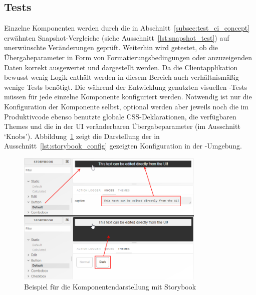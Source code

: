 \subsection{Tests}
Einzelne Komponenten werden durch die in Abschnitt~\ref{subsec:test_ci_concept} erwähnten Snapshot-Vergleiche (siehe Ausschnitt~\ref{lst:snapshot_test}) auf unerwünschte Veränderungen geprüft. Weiterhin wird getestet, ob die Übergabeparameter in Form von Formatierungsbedingungen oder anzuzeigenden Daten korrekt ausgewertet und dargestellt werden. Da die Clientapplikation bewusst wenig Logik enthält werden in diesem Bereich auch verhältnismäßig wenige Tests benötigt.
Die während der Entwicklung genutzten visuellen -Tests müssen für jede einzelne Komponente konfiguriert werden. Notwendig ist nur die Konfiguration der Komponente selbst, optional werden aber jeweils noch die im Produktivcode ebenso benutzte globale CSS-Deklarationen, die verfügbaren Themes und die in der UI veränderbaren Übergabeparameter (im Ausschnitt `Knobs'). Abbildung~\ref{fig:storybook_example} zeigt die Darstellung der in Ausschnitt~\ref{lst:storybook_config} gezeigten Konfiguration in der -Umgebung.





\begin{figure}
    \centering
    \captionsetup{justification=centering}
    \includegraphics[width=0.8\textwidth]{figures/storybook_example.png}
        \caption{Beispiel für die Komponentendarstellung mit Storybook}\label{fig:storybook_example}
\end{figure}


